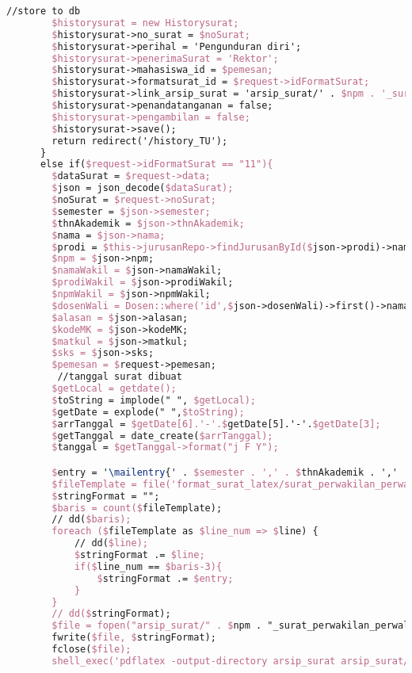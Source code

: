 \begin{lstlisting}[language=tex,basicstyle=\tiny,caption=HistorysuratController.php]
        //store to db
        $historysurat = new Historysurat;
        $historysurat->no_surat = $noSurat;
        $historysurat->perihal = 'Pengunduran diri';
        $historysurat->penerimaSurat = 'Rektor';
        $historysurat->mahasiswa_id = $pemesan;
        $historysurat->formatsurat_id = $request->idFormatSurat;
        $historysurat->link_arsip_surat = 'arsip_surat/' . $npm . '_surat_pengunduran_diri.pdf';
        $historysurat->penandatanganan = false;
        $historysurat->pengambilan = false;
        $historysurat->save();
        return redirect('/history_TU');
      }
      else if($request->idFormatSurat == "11"){
        $dataSurat = $request->data;
        $json = json_decode($dataSurat);
        $noSurat = $request->noSurat;
        $semester = $json->semester;
        $thnAkademik = $json->thnAkademik;
        $nama = $json->nama;
        $prodi = $this->jurusanRepo->findJurusanById($json->prodi)->nama_jurusan;
        $npm = $json->npm;
        $namaWakil = $json->namaWakil;
        $prodiWakil = $json->prodiWakil;
        $npmWakil = $json->npmWakil;
        $dosenWali = Dosen::where('id',$json->dosenWali)->first()->nama_dosen;
        $alasan = $json->alasan;
        $kodeMK = $json->kodeMK;
        $matkul = $json->matkul;
        $sks = $json->sks;
        $pemesan = $request->pemesan;
         //tanggal surat dibuat
        $getLocal = getdate();
        $toString = implode(" ", $getLocal);
        $getDate = explode(" ",$toString);
        $arrTanggal = $getDate[6].'-'.$getDate[5].'-'.$getDate[3];
        $getTanggal = date_create($arrTanggal);
        $tanggal = $getTanggal->format("j F Y");

        $entry = '\mailentry{' . $semester . ',' . $thnAkademik . ',' . $nama . ',' . $prodi . ',' . $npm . ',' . $namaWakil . ',' . $prodiWakil . ',' . $npmWakil . ',' . $dosenWali . ',' . $alasan . ',' . $kodeMK . ',' . $matkul . ',' . $sks . ',' . $tanggal . '}';
        $fileTemplate = file('format_surat_latex/surat_perwakilan_perwalian_1mk.tex');
        $stringFormat = "";
        $baris = count($fileTemplate);
        // dd($baris);
        foreach ($fileTemplate as $line_num => $line) {
            // dd($line);
            $stringFormat .= $line;
            if($line_num == $baris-3){
                $stringFormat .= $entry;
            }
        }
        // dd($stringFormat);
        $file = fopen("arsip_surat/" . $npm . "_surat_perwakilan_perwalian_1mk.tex", "w");
        fwrite($file, $stringFormat);
        fclose($file);
        shell_exec('pdflatex -output-directory arsip_surat arsip_surat/' . $npm . '_surat_perwakilan_perwalian_1mk.tex');


\end{lstlisting}
